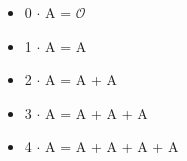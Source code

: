 \begin{itemize}
    \item[] 0 $\cdot$ A = $\mathcal{O}$
    \item[] 1 $\cdot$ A = A
    \item[] 2 $\cdot$ A = A + A
    \item[] 3 $\cdot$ A = A + A + A
    \item[] 4 $\cdot$ A = A + A + A + A
\end{itemize}

